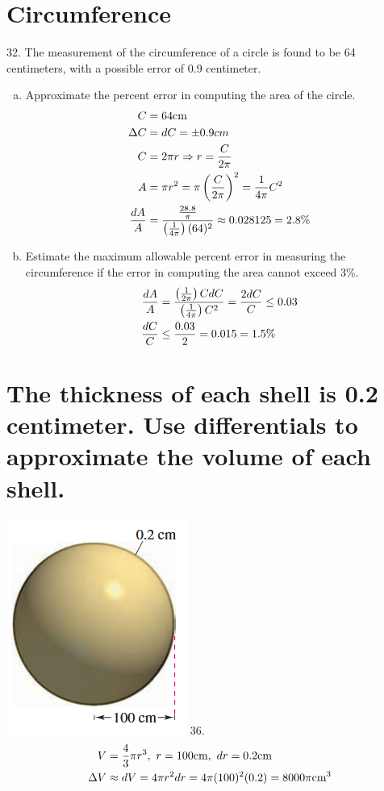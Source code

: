 \documentclass[11pt]{article}
\newcommand*{\set}{\setcounter{equation}{0}}
\begin{document}
\section{Circumference}
32. The measurement of the circumference of a circle is found to be 64 centimeters, with a possible error of 0.9 centimeter.
\begin{enumerate}[(a)]
    \item Approximate the percent error in computing the area of the circle.
        \begin{align}
            \set
            C&=64\text{cm}\\
            \Delta C&=dC=\pm 0.9cm\\
            C&=2\pi r\Rightarrow r=\frac{C}{2\pi}\\
            A&=\pi r^2=\pi\left(\frac{C}{2\pi}\right)^2=\frac{1}{4\pi}C^2\\
            \frac{dA}{A}&=\frac{\frac{28.8}{\pi}}{\left(\frac{1}{4\pi}\right)(64)^2}\approx 0.028125=2.8\%\\
        \end{align}
    \item Estimate the maximum allowable percent error in measuring the circumference if the error in computing the area cannot exceed 3\%.
        \begin{align}
            \set
            \frac{dA}{A}&=\frac{\left(\frac{1}{2\pi}\right)CdC}{\left(\frac{1}{4\pi}\right)C^2}=\frac{2dC}{C}\leq 0.03\\
            \frac{dC}{C}&\leq\frac{0.03}{2}=0.015=1.5\%
        \end{align}
\end{enumerate}

\section{The thickness of each shell is 0.2 centimeter. Use differentials to approximate the volume of each shell.}
\includegraphics{36.png}
36.\begin{align}
    \set
    V&=\frac{4}{3}\pi r^3,\,\, r=100\text{cm},\,\, dr=0.2\text{cm}\\
    \Delta V&\approx dV=4\pi r^2dr=4\pi(100)^2(0.2)=8000\pi\text{cm}^3
\end{align}
\end{document}
